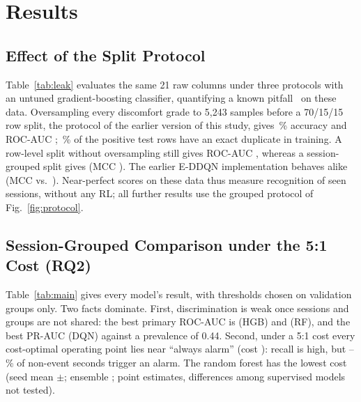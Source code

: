 \section{Results}
\label{sec:results}

\subsection{Effect of the Split Protocol}
\label{sec:leak}
Table~\ref{tab:leak} evaluates the same 21 raw columns under three protocols with an untuned gradient-boosting classifier, quantifying a known pitfall~\cite{kapoor2023leakage,kaufman2012leakage} on these data. Oversampling every discomfort grade to 5,243 samples before a 70/15/15 row split, the protocol of the earlier version of this study, gives \LeakOldAcc\,\% accuracy and ROC-AUC \LeakOldRocAuc; \LeakDupPct\,\% of the positive test rows have an exact duplicate in training. A row-level split without oversampling still gives ROC-AUC \LeakRowRocAuc, whereas a session-grouped split gives \LeakGrpRocAuc{} (MCC \LeakGrpMCC). The earlier E-DDQN implementation behaves alike (MCC \OrigOldMCC{} vs.\ \OrigGrpMCC). Near-perfect scores on these data thus measure recognition of seen sessions, without any RL; all further results use the grouped protocol of Fig.~\ref{fig:protocol}.

\begin{table}[t]
\centering
\caption{Effect of the evaluation protocol on the same data (21 raw columns; test-split metrics). ``Proxy'': reconstruction of the earlier protocol, whose 41-feature input files were not available.}
\label{tab:leak}
\resizebox{\textwidth}{!}{}
\end{table}

\subsection{Session-Grouped Comparison under the 5:1 Cost (RQ2)}
\label{sec:main}
Table~\ref{tab:main} gives every model's result, with thresholds chosen on validation groups only. Two facts dominate. First, discrimination is weak once sessions and groups are not shared: the best primary ROC-AUC is \HGBCostRocAucMean{} (HGB) and \RFCostRocAucMean{} (RF), and the best PR-AUC \DQNCostPrAucMean{} (DQN) against a prevalence of 0.44. Second, under a 5:1 cost every cost-optimal operating point lies near ``always alarm'' (cost \AlwaysCost): recall is high, but \DOneFPRMin--\DOneFPRMax\,\% of non-event seconds trigger an alarm. The random forest has the lowest cost (seed mean \RFCostCostMean$\pm$\RFCostCostSD; ensemble \PHEnsRFCost; point estimates, differences among supervised models not tested).

